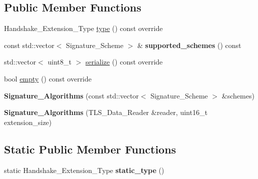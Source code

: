 \subsection*{Public Member Functions}
\begin{DoxyCompactItemize}
\item 
Handshake\+\_\+\+Extension\+\_\+\+Type \hyperlink{class_botan_1_1_t_l_s_1_1_signature___algorithms_a9a316f000ee5c6eb181e6109bbc40b55}{type} () const override
\item 
\mbox{\label{class_botan_1_1_t_l_s_1_1_signature___algorithms_a226e194c58f4b78c0ff22a275dc17c95}} 
const std\+::vector$<$ Signature\+\_\+\+Scheme $>$ \& {\bfseries supported\+\_\+schemes} () const
\item 
std\+::vector$<$ uint8\+\_\+t $>$ \hyperlink{class_botan_1_1_t_l_s_1_1_signature___algorithms_aa4363eab527673a1474a7e048e0ad616}{serialize} () const override
\item 
bool \hyperlink{class_botan_1_1_t_l_s_1_1_signature___algorithms_a7216e44527a194bebce7d616d6d3fe62}{empty} () const override
\item 
\mbox{\label{class_botan_1_1_t_l_s_1_1_signature___algorithms_a3c88a6815d89dc085d44d9aafb186e89}} 
{\bfseries Signature\+\_\+\+Algorithms} (const std\+::vector$<$ Signature\+\_\+\+Scheme $>$ \&schemes)
\item 
\mbox{\label{class_botan_1_1_t_l_s_1_1_signature___algorithms_a83f618cfa1f709bd284dfd838421394d}} 
{\bfseries Signature\+\_\+\+Algorithms} (T\+L\+S\+\_\+\+Data\+\_\+\+Reader \&reader, uint16\+\_\+t extension\+\_\+size)
\end{DoxyCompactItemize}
\subsection*{Static Public Member Functions}
\begin{DoxyCompactItemize}
\item 
\mbox{\label{class_botan_1_1_t_l_s_1_1_signature___algorithms_a11ade2a28f47914ca39151db3c56875e}} 
static Handshake\+\_\+\+Extension\+\_\+\+Type {\bfseries static\+\_\+type} ()
\end{DoxyCompactItemize}


